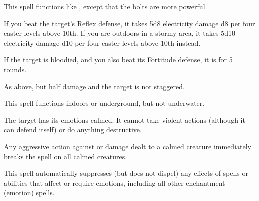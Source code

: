 \begin{spelleffect}
    This spell functions like , except that the bolts are more powerful.
\end{spelleffect}
\begin{spellsuccess}
    If you beat the target's Reflex defense, it takes 5d8 electricity damage \add d8 per four caster levels above 10th. If you are outdoors in a stormy area, it takes 5d10 electricity damage \add d10 per four caster levels above 10th instead.

    If the target is bloodied, and you also beat its Fortitude defense, it is \staggered for 5 rounds.
\end{spellsuccess}
\begin{spellfailure}
    As above, but half damage and the target is not staggered.
\end{spellfailure}
\begin{spellnotes}
    This spell functions indoors or underground, but not underwater. \destructivespellnotes
\end{spellnotes}

\begin{spellsuccess}
    The target has its emotions calmed. It cannot take violent actions (although it can defend itself) or do anything destructive.
\end{spellsuccess}
\begin{spellnotes}
    Any aggressive action against or damage dealt to a calmed creature immediately breaks the spell on all calmed creatures.

    This spell automatically suppresses (but does not dispel) any effects of spells or abilities that affect or require emotions, including all other enchantment (emotion) spells.
\end{spellnotes}

